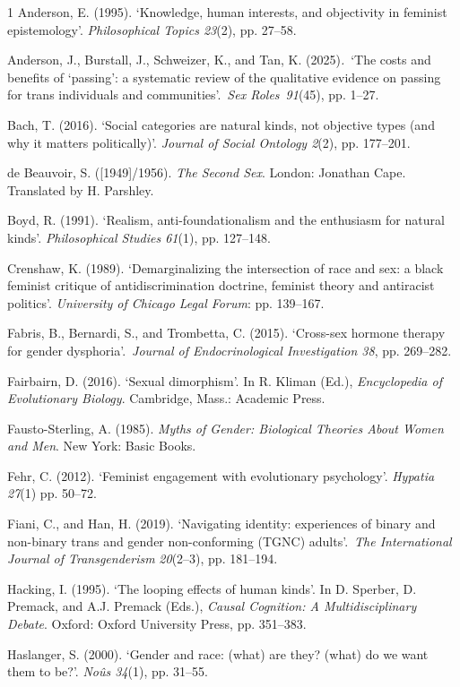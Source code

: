 \begin{hangparas}{\hangingindent}{1}
Anderson, E. (1995). `Knowledge, human interests, and objectivity in
feminist epistemology'. \emph{Philosophical Topics 23}(2), pp. 27--58.

Anderson, J., Burstall, J., Schweizer, K., and Tan, K.
(2025)\emph{.}~`The costs and benefits of `passing': a systematic review
of the qualitative evidence on passing for trans individuals and
communities'.~\emph{Sex Roles}~\emph{91}(45), pp. 1--27.

Bach, T. (2016). `Social categories are natural kinds, not objective
types (and why it matters politically)'. \emph{Journal of Social
Ontology 2}(2), pp. 177--201.

de Beauvoir, S. ({[}1949{]}/1956). \emph{The Second Sex}. London:
Jonathan Cape. Translated by H. Parshley.

Boyd, R. (1991). `Realism, anti-foundationalism and the enthusiasm for
natural kinds'. \emph{Philosophical Studies 61}(1), pp. 127--148.

Crenshaw, K. (1989). `Demarginalizing the intersection of race and sex:
a black feminist critique of antidiscrimination doctrine, feminist
theory and antiracist politics'. \emph{University of Chicago Legal
Forum}: pp. 139--167.

Fabris, B., Bernardi, S., and Trombetta, C. (2015). `Cross-sex hormone
therapy for gender dysphoria'.~\emph{Journal of Endocrinological
Investigation 38}, pp. 269--282.

Fairbairn, D. (2016). `Sexual dimorphism'. In R. Kliman (Ed.),
\emph{Encyclopedia of Evolutionary Biology}. Cambridge, Mass.: Academic
Press.

Fausto-Sterling, A. (1985). \emph{Myths of Gender: Biological Theories
About Women and Men}. New York: Basic Books.

Fehr, C. (2012). `Feminist engagement with evolutionary psychology'.
\emph{Hypatia 27}(1) pp. 50--72.

Fiani, C., and Han, H. (2019). `Navigating identity: experiences of
binary and non-binary trans and gender non-conforming (TGNC)
adults'.~\emph{The International Journal of Transgenderism}
\emph{20}(2--3), pp. 181--194.

Hacking, I. (1995). `The looping effects of human kinds'. In D. Sperber,
D. Premack, and A.J. Premack (Eds.), \emph{Causal Cognition: A
Multidisciplinary Debate}. Oxford: Oxford University Press, pp.
351--383.

Haslanger, S. (2000). `Gender and race: (what) are they? (what) do we
want them to be?'. \emph{Noûs 34}(1), pp. 31--55.


\end{hangparas}
